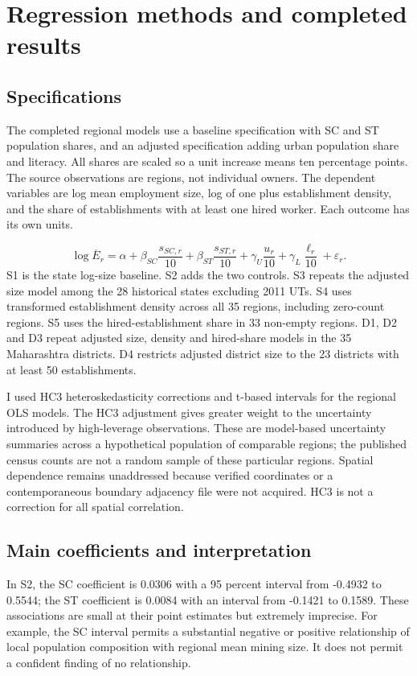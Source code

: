 \documentclass[11pt,a4paper]{report}
\begin{document}
\chapter{Regression methods and completed results}
\section{Specifications}
The completed regional models use a baseline specification with SC and ST population shares, and an adjusted specification adding urban population share and literacy. All shares are scaled so a unit increase means ten percentage points. The source observations are regions, not individual owners. The dependent variables are log mean employment size, log of one plus establishment density, and the share of establishments with at least one hired worker. Each outcome has its own units.

\[
\log \overline E_r=\alpha+\beta_{SC}\frac{s_{SC,r}}{10}
+\beta_{ST}\frac{s_{ST,r}}{10}
+\gamma_U\frac{u_r}{10}+\gamma_L\frac{\ell_r}{10}+\varepsilon_r.
\]
S1 is the state log-size baseline. S2 adds the two controls. S3 repeats the adjusted size model among the 28 historical states excluding 2011 UTs. S4 uses transformed establishment density across all 35 regions, including zero-count regions. S5 uses the hired-establishment share in 33 non-empty regions. D1, D2 and D3 repeat adjusted size, density and hired-share models in the 35 Maharashtra districts. D4 restricts adjusted district size to the 23 districts with at least 50 establishments.

I used HC3 heteroskedasticity corrections and t-based intervals for the regional OLS models. The HC3 adjustment gives greater weight to the uncertainty introduced by high-leverage observations. These are model-based uncertainty summaries across a hypothetical population of comparable regions; the published census counts are not a random sample of these particular regions. Spatial dependence remains unaddressed because verified coordinates or a contemporaneous boundary adjacency file were not acquired. HC3 is not a correction for all spatial correlation.

\section{Main coefficients and interpretation}
In S2, the SC coefficient is 0.0306 with a 95 percent interval from -0.4932 to 0.5544; the ST coefficient is 0.0084 with an interval from -0.1421 to 0.1589. These associations are small at their point estimates but extremely imprecise. For example, the SC interval permits a substantial negative or positive relationship of local population composition with regional mean mining size. It does not permit a confident finding of no relationship.
\end{document}
